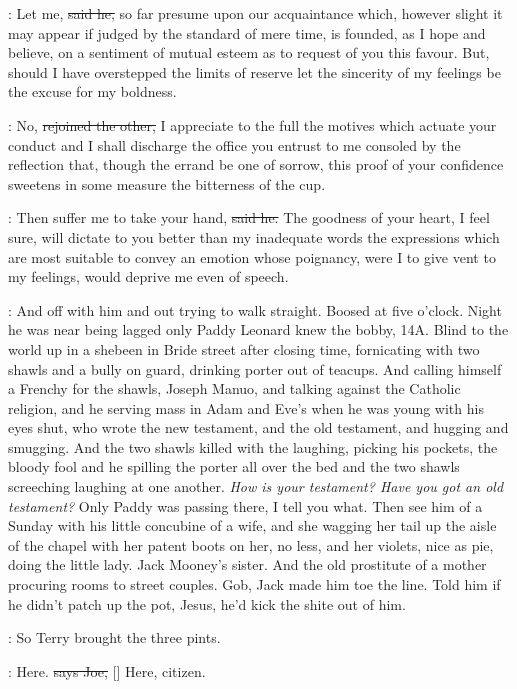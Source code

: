 \doran:
Let me,
\sout{said he,}
so far presume upon our acquaintance which,
however
slight it may appear if judged by the standard of mere time,
is founded,
as I hope and believe,
on a sentiment of mutual esteem as to request of
you this favour.
But,
should I have overstepped the limits of reserve
let the sincerity of my feelings
be the excuse for my boldness.

\Bloom:
No,
\sout{rejoined the other,}
I appreciate to the full the motives which
actuate your conduct and I shall discharge the office you entrust
to me consoled by the reflection that,
though the errand be one of
sorrow,
this proof of your confidence sweetens in some measure the
bitterness of the cup.

\doran:
Then suffer me to take your hand,
\sout{said he.}
The goodness of your heart,
I
feel sure,
will dictate to you better than my inadequate words the
expressions which are most suitable to convey an emotion whose
poignancy,
were I to give vent to my feelings,
would deprive me even of
speech.

\Nq:
And off with him and out trying to walk straight.
Boosed at five
o'clock.
Night he was near being lagged only Paddy Leonard knew the bobby,
14A.
Blind to the world up in a shebeen in Bride street after closing
time,
fornicating with two shawls and a bully on guard,
drinking porter
out of teacups.
And calling himself a Frenchy for the shawls,
Joseph
Manuo,
and talking against the Catholic religion,
and he serving mass in
Adam and Eve's when he was young with his eyes shut,
who wrote the new
testament,
and the old testament,
and hugging and smugging.
And the two
shawls killed with the laughing,
picking his pockets,
the bloody
fool and he spilling the porter all over the bed and the two shawls
screeching laughing at one another.
\emph{How is your testament?
Have you
got an old testament?} Only Paddy was passing there,
I tell you what.
Then see him of a Sunday with his little concubine of a wife,
and
she wagging her tail up the aisle of the chapel with her patent boots
on her,
no less,
and her violets,
nice as pie,
doing the little lady.
Jack Mooney's sister.
And the old prostitute of a mother
procuring rooms to street couples.
Gob,
Jack made him toe the line.
Told
him if he didn't patch up the pot,
Jesus,
he'd kick the shite out of him.

\Nq:
So Terry brought the three pints.

\joe:
Here.
\sout{says Joe,}
[] Here,
citizen.

